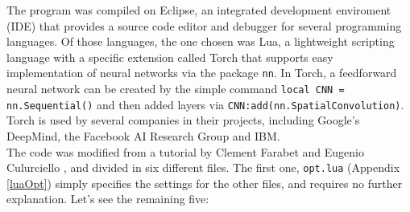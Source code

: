 \documentclass[titlepage]{article}
\theoremstyle{plain}
\theoremstyle{definition}
\begin{document}
		The program was compiled on Eclipse, an integrated development enviroment (IDE) that provides a source code editor and debugger for several programming languages. Of those languages, the one chosen was Lua, a lightweight scripting language with a specific extension called Torch that supports easy implementation of neural networks via the package \texttt{nn}. In Torch, a feedforward neural network can be created by the simple command \texttt{local CNN = nn.Sequential()} and then added layers via \texttt{CNN:add(nn.SpatialConvolution)}. Torch is used by several companies in their projects, including Google's DeepMind, the Facebook AI Research Group and IBM.\\
		The code was modified from a tutorial by Clement Farabet and Eugenio Culurciello \cite{torchCodeSource}, and divided in six different files. The first one, \texttt{opt.lua} (Appendix \ref{luaOpt}) simply specifies the settings for the other files, and requires no further explanation. Let's see the remaining five:
\end{document}
